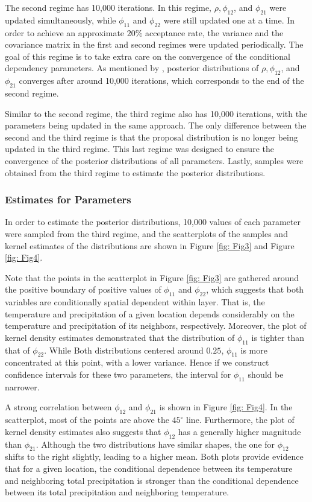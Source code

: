 \documentclass{article}
\begin{document}
The second regime has 10,000 iterations. In this regime, $\rho, \phi_{12}$, and $\phi_{21}$ were updated simultaneously, while $\phi_{11}$ and $\phi_{22}$ were still updated one at a time. In order to achieve an approximate $20 \%$ acceptance rate, the variance and the covariance matrix in the first and second regimes were updated periodically. The goal of this regime is to take extra care on the convergence of the conditional dependency parameters. As mentioned by \cite{paper}, posterior distributions of $\rho, \phi_{12}$, and $\phi_{21}$ converges after around 10,000 iterations, which corresponds to the end of the second regime. 

Similar to the second regime, the third regime also has 10,000 iterations, with the parameters being updated in the same approach. The only difference between the second and the third regime is that the proposal distribution is no longer being updated in the third regime. This last regime was designed to ensure the convergence of the posterior distributions of all parameters. Lastly, samples were obtained from the third regime to estimate the posterior distributions.  

\subsubsection{Estimates for Parameters}
\label{sec: WinParams}
In order to estimate the posterior distributions, 10,000 values of each parameter were sampled from the third regime, and the scatterplots of the samples and kernel estimates of the distributions are shown in Figure \ref{fig: Fig3} and Figure \ref{fig: Fig4}. 

Note that the points in the scatterplot in Figure \ref{fig: Fig3} are gathered around the positive boundary of positive values of $\phi_{11}$ and $\phi_{22}$, which suggests that both variables are conditionally spatial dependent within layer. That is, the temperature and precipitation of a given location depends considerably on the temperature and precipitation of its neighbors, respectively. Moreover, the plot of kernel density estimates demonstrated that the distribution of $\phi_{11}$ is tighter than that of $\phi_{22}$. While Both distributions centered around $0.25$, $\phi_{11}$ is more concentrated at this point, with a lower variance. Hence if we construct confidence intervals for these two parameters, the interval for $\phi_{11}$ should be narrower. 

A strong correlation between $\phi_{12}$ and $\phi_{21}$ is shown in Figure \ref{fig: Fig4}. In the scatterplot, most of the points are above the $45 ^\circ$ line. Furthermore, the plot of kernel density estimates also suggests that $\phi_{12}$ has a generally higher magnitude than $\phi_{21}$. Although the two distributions have similar shapes, the one for $\phi_{12}$ shifts to the right slightly, leading to a higher mean. Both plots provide evidence that for a given location, the conditional dependence between its temperature and neighboring total precipitation is stronger than the conditional dependence between its total precipitation and neighboring temperature. 
\end{document}

